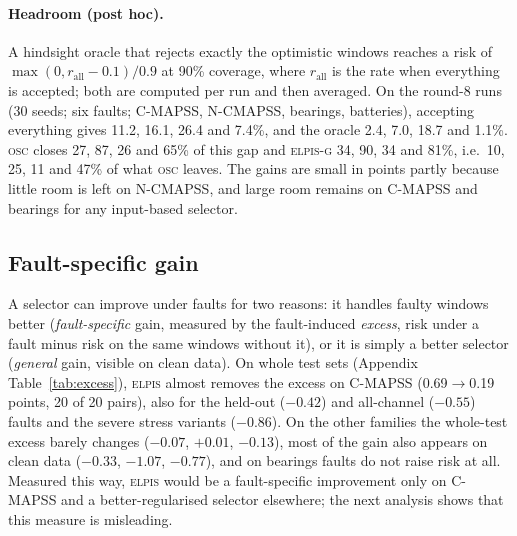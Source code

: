 \documentclass{esannV2}
\newcommand{\OSC}{\textsc{osc}}
\newcommand{\RPT}{\textsc{elpis}}
\newcommand{\AUTOD}{\textsc{elpis-g}}
\begin{document}
\paragraph{Headroom (post hoc).} A hindsight oracle that rejects exactly the optimistic windows reaches a risk of $\max(0,r_{\text{all}}-0.1)/0.9$ at 90\% coverage, where $r_{\text{all}}$ is the rate when everything is accepted; both are computed per run and then averaged. On the round-8 runs (30 seeds; six faults; C-MAPSS, N-CMAPSS, bearings, batteries), accepting everything gives 11.2, 16.1, 26.4 and 7.4\%, and the oracle 2.4, 7.0, 18.7 and 1.1\%. \OSC{} closes 27, 87, 26 and 65\% of this gap and \AUTOD{} 34, 90, 34 and 81\%, i.e.\ 10, 25, 11 and 47\% of what \OSC{} leaves. The gains are small in points partly because little room is left on N-CMAPSS, and large room remains on C-MAPSS and bearings for any input-based selector.



\FloatBarrier
\subsection{Fault-specific gain}
A selector can improve under faults for two reasons: it handles faulty windows better (\emph{fault-specific} gain, measured by the fault-induced \emph{excess}, risk under a fault minus risk on the same windows without it), or it is simply a better selector (\emph{general} gain, visible on clean data). On whole test sets (Appendix Table~\ref{tab:excess}), \RPT{} almost removes the excess on C-MAPSS (0.69$\to$0.19 points, 20 of 20 pairs), also for the held-out ($-0.42$) and all-channel ($-0.55$) faults and the severe stress variants ($-0.86$). On the other families the whole-test excess barely changes ($-0.07$, $+0.01$, $-0.13$), most of the gain also appears on clean data ($-0.33$, $-1.07$, $-0.77$), and on bearings faults do not raise risk at all. Measured this way, \RPT{} would be a fault-specific improvement only on C-MAPSS and a better-regularised selector elsewhere; the next analysis shows that this measure is misleading.
\end{document}
